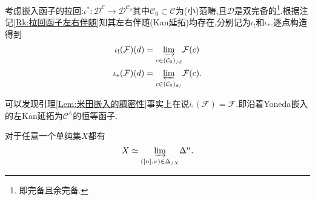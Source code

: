 \begin{remark}\label{Rk:嵌入的Kan延拓}
    考虑嵌入函子的拉回:$\iota^{*} : \mathcal{D}^{\mathcal{E}}\to \mathcal{D}^{\mathcal{C}_0}$其中$\mathcal{C}_0\subset \mathcal{C}$为(小)范畴,且$\mathcal{D}$是双完备的\footnote{即完备且余完备.}.根据注记\ref{Rk:拉回函子左右伴随}知其左右伴随(Kan延拓)均存在,分别记为$\iota_!$和$\iota_*$.逐点构造得到
    \begin{align*}
        \iota_!(\mathcal{F})(d) &= \underset{c\in (\mathcal{C}_0)_{/d}}{\underrightarrow{\lim}} \mathcal{F}(c)\\
        \iota_*(\mathcal{F})(d) & = \underset{c\in (\mathcal{C}_0)_{d/}}{\underleftarrow{\lim}}\mathcal{F}(c).
    \end{align*}
\end{remark}
可以发现引理\ref{Lem:米田嵌入的稠密性}事实上在说$\iota_!(\mathcal{F}) = \mathcal{F}$.即沿着Yoneda嵌入的左Kan延拓为$\mathcal{C}^{\land}$的恒等函子.
\begin{corollary}\label{Cor:单纯集逼近}
    对于任意一个单纯集$X$都有
    \[
    X \simeq \underset{([n],\sigma)\in\Delta_{/X} }{\underrightarrow{\lim}} \Delta^n.
    \]
\end{corollary}
